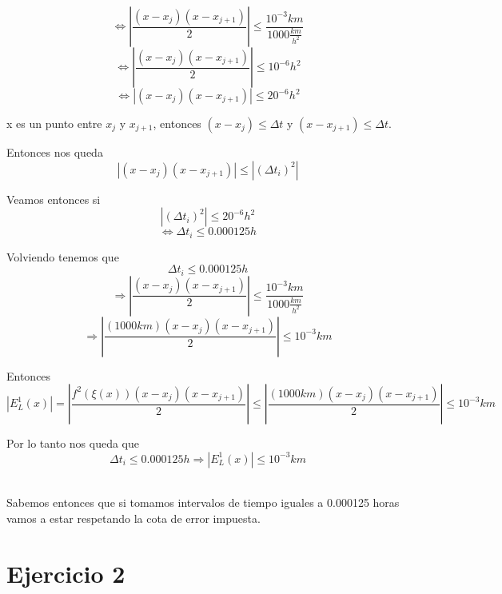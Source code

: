 \documentclass[a4paper,10pt]{article}
\begin{document}
\begin{equation}
	\Leftrightarrow | \frac{(x - x_j)(x - x_{j+1})}{2} | \leq \frac{10^{-3} km}{1000 \frac{km}{h^2}}
\end{equation}
\begin{equation}
	\Leftrightarrow | \frac{(x - x_j)(x - x_{j+1})}{2} | \leq 10^{-6} h^2
\end{equation}
\begin{equation}
	\Leftrightarrow |(x - x_j)(x - x_{j+1}) | \leq 20^{-6} h^2
\end{equation}
\par x es un punto entre $x_j$ y $x_{j+1}$, entonces $(x - x_j) \le \Delta t$ y $(x - x_{j+1}) \le \Delta t$.
\par Entonces nos queda
\begin{equation}
	|(x - x_j)(x - x_{j+1}) | \leq | (\Delta t_i)^2 |
\end{equation}
\par Veamos entonces si
\begin{equation}
	| (\Delta t_i)^2 | \leq 20^{-6} h^2
\end{equation}
\begin{equation}
	\Leftrightarrow  \Delta t_i \leq 0.000125 h
\end{equation}

\par Volviendo tenemos que
\begin{equation}
	\Delta t_i \leq 0.000125 h
\end{equation}
\begin{equation}
	 \Rightarrow | \frac{(x - x_j)(x - x_{j+1})}{2} | \leq \frac{10^{-3} km}{1000 \frac{km}{h^2}}
\end{equation}
\begin{equation}
	 \Rightarrow | \frac{(1000 km)(x - x_j)(x - x_{j+1})}{2} | \leq 10^{-3} km
\end{equation}
\par Entonces
\begin{equation}
	| E_L^1(x) | = | \frac{f^2(\xi(x))(x - x_j)(x - x_{j+1})}{2} | \leq | \frac{(1000 km)(x - x_j)(x - x_{j+1})}{2} | \leq 10^{-3} km
\end{equation}
\par Por lo tanto nos queda que
\begin{equation}
	\Delta t_i \leq 0.000125 h \Rightarrow | E_L^1(x) | \leq 10^{-3} km
\end{equation}
\\
\par Sabemos entonces que si tomamos intervalos de tiempo iguales a 0.000125 horas vamos a estar respetando la cota de error impuesta.


\section{Ejercicio 2}
\end{document}
